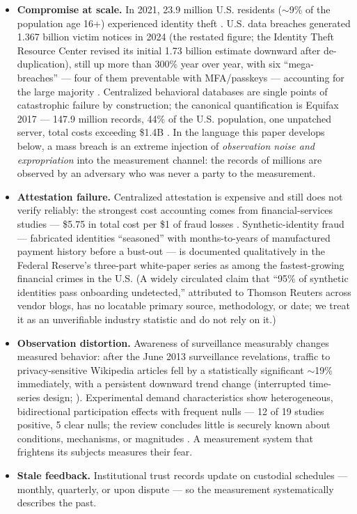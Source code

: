 \documentclass[
]{article}
\begin{document}
\begin{itemize}
\item
  \textbf{Compromise at scale.} In 2021, 23.9 million U.S. residents
  (\(\sim\)9\% of the population age 16+) experienced identity theft .
  U.S. data breaches generated 1.367 billion victim notices in 2024 (the
  restated figure; the Identity Theft Resource Center revised its
  initial 1.73 billion estimate downward after de-duplication), still up
  more than 300\% year over year, with six ``mega-breaches'' --- four of
  them preventable with MFA/passkeys --- accounting for the large
  majority . Centralized behavioral databases are single points of
  catastrophic failure by construction; the canonical quantification is
  Equifax 2017 --- 147.9 million records, 44\% of the U.S. population,
  one unpatched server, total costs exceeding \$1.4B . In the language
  this paper develops below, a mass breach is an extreme injection of
  \emph{observation noise and expropriation} into the measurement
  channel: the records of millions are observed by an adversary who was
  never a party to the measurement.
\item
  \textbf{Attestation failure.} Centralized attestation is expensive and
  still does not verify reliably: the strongest cost accounting comes
  from financial-services studies --- \$5.75 in total cost per \$1 of
  fraud losses . Synthetic-identity fraud --- fabricated identities
  ``seasoned'' with months-to-years of manufactured payment history
  before a bust-out --- is documented qualitatively in the Federal
  Reserve's three-part white-paper series as among the fastest-growing
  financial crimes in the U.S. (A widely circulated claim that ``95\% of
  synthetic identities pass onboarding undetected,'' attributed to
  Thomson Reuters across vendor blogs, has no locatable primary source,
  methodology, or date; we treat it as an unverifiable industry
  statistic and do not rely on it.)
\item
  \textbf{Observation distortion.} Awareness of surveillance measurably
  changes measured behavior: after the June 2013 surveillance
  revelations, traffic to privacy-sensitive Wikipedia articles fell by a
  statistically significant \(\sim\)19\% immediately, with a persistent
  downward trend change (interrupted time-series design; ). Experimental
  demand characteristics show heterogeneous, bidirectional participation
  effects with frequent nulls --- 12 of 19 studies positive, 5 clear
  nulls; the review concludes little is securely known about conditions,
  mechanisms, or magnitudes . A measurement system that frightens its
  subjects measures their fear.
\item
  \textbf{Stale feedback.} Institutional trust records update on
  custodial schedules --- monthly, quarterly, or upon dispute --- so the
  measurement systematically describes the past.
\end{itemize}
\end{document}

